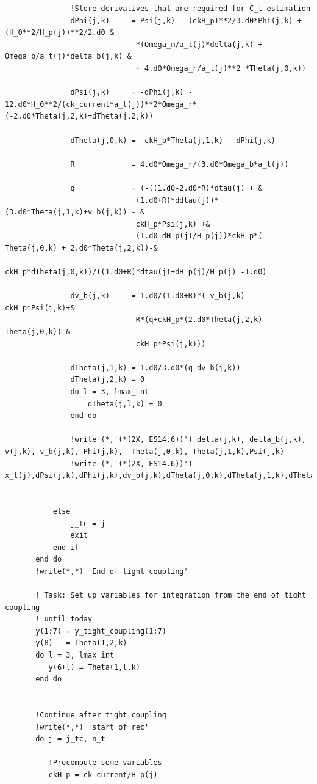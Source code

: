\documentclass[a4paper]{report}
\begin{document}
\begin{verbatim}
               !Store derivatives that are required for C_l estimation
               dPhi(j,k)     = Psi(j,k) - (ckH_p)**2/3.d0*Phi(j,k) + (H_0**2/H_p(j))**2/2.d0 &
                              *(Omega_m/a_t(j)*delta(j,k) + Omega_b/a_t(j)*delta_b(j,k) &
                              + 4.d0*Omega_r/a_t(j)**2 *Theta(j,0,k))

               dPsi(j,k)     = -dPhi(j,k) - 12.d0*H_0**2/(ck_current*a_t(j))**2*Omega_r*(-2.d0*Theta(j,2,k)+dTheta(j,2,k))

               dTheta(j,0,k) = -ckH_p*Theta(j,1,k) - dPhi(j,k)

               R             = 4.d0*Omega_r/(3.d0*Omega_b*a_t(j))

               q             = (-((1.d0-2.d0*R)*dtau(j) + &
                              (1.d0+R)*ddtau(j))*(3.d0*Theta(j,1,k)+v_b(j,k)) - &
                              ckH_p*Psi(j,k) +&
                              (1.d0-dH_p(j)/H_p(j))*ckH_p*(-Theta(j,0,k) + 2.d0*Theta(j,2,k))-&
                              ckH_p*dTheta(j,0,k))/((1.d0+R)*dtau(j)+dH_p(j)/H_p(j) -1.d0)
 
               dv_b(j,k)     = 1.d0/(1.d0+R)*(-v_b(j,k)-ckH_p*Psi(j,k)+&
                              R*(q+ckH_p*(2.d0*Theta(j,2,k)-Theta(j,0,k))-&
                              ckH_p*Psi(j,k)))

               dTheta(j,1,k) = 1.d0/3.d0*(q-dv_b(j,k))
               dTheta(j,2,k) = 0
               do l = 3, lmax_int
                   dTheta(j,l,k) = 0 
               end do	

               !write (*,'(*(2X, ES14.6))') delta(j,k), delta_b(j,k), v(j,k), v_b(j,k), Phi(j,k),  Theta(j,0,k), Theta(j,1,k),Psi(j,k)
               !write (*,'(*(2X, ES14.6))') x_t(j),dPsi(j,k),dPhi(j,k),dv_b(j,k),dTheta(j,0,k),dTheta(j,1,k),dTheta(j,2,k)


           else
               j_tc = j
               exit
           end if
       end do
       !write(*,*) 'End of tight coupling'

       ! Task: Set up variables for integration from the end of tight coupling 
       ! until today
       y(1:7) = y_tight_coupling(1:7)
       y(8)   = Theta(1,2,k)
       do l = 3, lmax_int
          y(6+l) = Theta(1,l,k)
       end do


       !Continue after tight coupling
       !write(*,*) 'start of rec'       
       do j = j_tc, n_t

          !Precompute some variables
          ckH_p = ck_current/H_p(j)


\end{verbatim}
\end{document}
